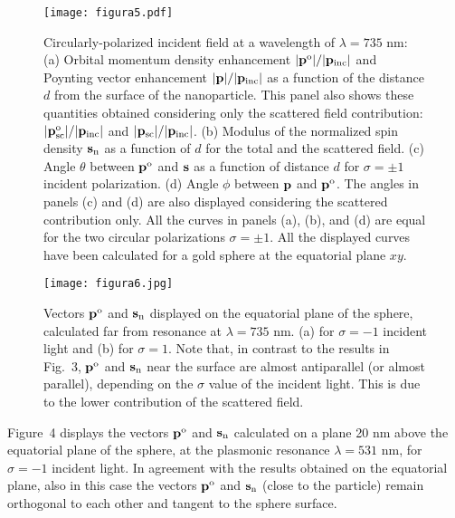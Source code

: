 \documentclass[journal=apchd5,manuscript=article]{achemso}
\begin{document}
\begin{figure}[!ht]
	\centering
	\texttt{[image: figura5.pdf]}
	\caption{Circularly-polarized incident field at a wavelength of $\lambda=735$ nm: (a) Orbital momentum density enhancement $|\bf p^{\rm o}|/|\bf p_{\rm inc}|$ and Poynting vector enhancement $|\bf p|/|\bf p_{\rm inc}|$  as a function of the distance $d$ from the surface of the nanoparticle. This panel also shows these quantities obtained considering only the scattered field contribution: $|\bf p^{\rm o}_{\rm sc}|/|\bf p_{\rm inc}|$ and  $|\bf p_{\rm sc}|/|\bf p_{\rm inc}|$. (b) Modulus of the normalized spin density $\bf s_{\rm n}$ as a function of $d$ for the total and the scattered field. (c) Angle $\theta$ between $\bf p^{\rm o}$ and $\bf s$ as a function of distance $d$ for $\sigma = \pm 1$ incident polarization. (d) Angle $\phi$ between ${\bf p}$ and $\bf p^{\rm o}$. The angles in panels (c) and (d) are also displayed considering the scattered contribution only. All the curves in  panels (a), (b), and (d) are equal for the two circular polarizations $\sigma = \pm 1$.
	All the displayed curves have been calculated for a gold sphere at the equatorial plane $xy$. 
		\label{fig:5}}
\end{figure}

\begin{figure}[!ht]
	\centering
	\texttt{[image: figura6.jpg]}
	\caption{Vectors $\bf p^{\rm o}$ and ${\bf s}_{\rm n}$ displayed on the equatorial plane of the sphere, calculated far from resonance at $\lambda = 735$ nm. (a) for  $\sigma = -1$ incident light  and (b) for  $\sigma = 1$. Note that, in contrast to the results in Fig.~3, $\bf p^{\rm o}$ and ${\bf s}_{\rm n}$ near the surface are almost antiparallel (or almost parallel), depending on the $\sigma$ value of the incident light. This is due to the lower contribution of the scattered field.  
		\label{fig:6}}
\end{figure}


Figure~4 displays the vectors $\bf p^{\rm o}$ and ${\bf s}_{\rm n}$ calculated on a plane 20 nm above the equatorial plane of the sphere, at the plasmonic resonance $\lambda = 531$ nm, for  $\sigma = -1$ incident light. In agreement with the results obtained on the equatorial plane, also in this case the vectors $\bf p^{\rm o}$ and ${\bf s}_{\rm n}$ (close to the particle) remain orthogonal to each other and tangent to the sphere surface.
\end{document}
